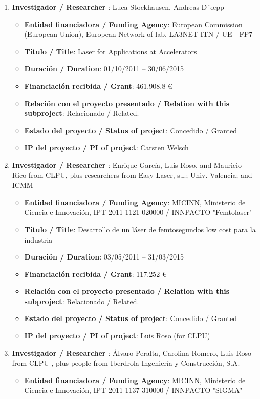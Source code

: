 \begin{enumerate}
\item {\bf Investigador / Researcher }: Luca Stockhausen, Andreas D´{\oe}pp
\begin{itemize}
	\item {\bf Entidad financiadora / Funding Agency}: European Commission (European Union), European Network of lab, LA3NET-ITN / UE - FP7
	\item {\bf Título / Title}: Laser for Applications at Accelerators
	\item {\bf Duración / Duration}: 01/10/2011 -- 30/06/2015
	\item {\bf Financiación recibida / Grant}:  461.908,8 \euro
	\item {\bf Relación con el proyecto presentado / Relation with this subproject}: Relacionado / Related.
	\item {\bf Estado del proyecto / Status of project}: Concedido / Granted
	\item {\bf IP del proyecto / PI of project}: Carsten Welsch
\end{itemize}
\item {\bf Investigador / Researcher }: Enrique Garc\'ia, Luis Roso, and Mauricio Rico from CLPU, plus researchers from Easy Laser, s.l.; Univ. Valencia; and ICMM
\begin{itemize}
	\item {\bf Entidad financiadora / Funding Agency}: MICINN, Ministerio de Ciencia e Innovaci\'on, IPT-2011-1121-020000 / INNPACTO "Femtolaser"
	\item {\bf Título / Title}:  Desarrollo de un l\'aser de femtosegundos low cost para la industria
	\item {\bf Duración / Duration}:  03/05/2011 -- 31/03/2015
	\item {\bf Financiación recibida / Grant}: 117.252 \euro 
	\item {\bf Relación con el proyecto presentado / Relation with this subproject}: Relacionado / Related. 
	\item {\bf Estado del proyecto / Status of project}: Concedido / Granted
	\item {\bf IP del proyecto / PI of project}: Luis Roso (for CLPU)
\end{itemize}
\item {\bf Investigador / Researcher }: \'Alvaro Peralta, Carolina Romero, Luis Roso from CLPU , plus people from Iberdrola Ingenier\'ia y Construcci\'on, S.A.
\begin{itemize}
	\item {\bf Entidad financiadora / Funding Agency}: MICINN, Ministerio de Ciencia e Innovaci\'on, IPT-2011-1137-310000  / INNPACTO "SIGMA"

\end{itemize}
\end{enumerate}
